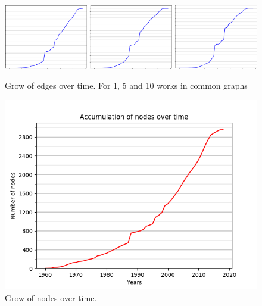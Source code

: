 \begin{figure}[!hbt]
	\begin{center}
	\includegraphics[width=\columnwidth]{graphics/edgesAccumulation.png}
	\caption{Grow of edges over time. For 1, 5 and 10 works in common graphs}
	\label{fig:accumulationEdges}

	\includegraphics[width=\columnwidth]{graphics/nodesAccumulation.png}
	\caption{Grow of nodes over time.}
	\label{fig:accumulationNodes}
	\end{center}
\end{figure}



